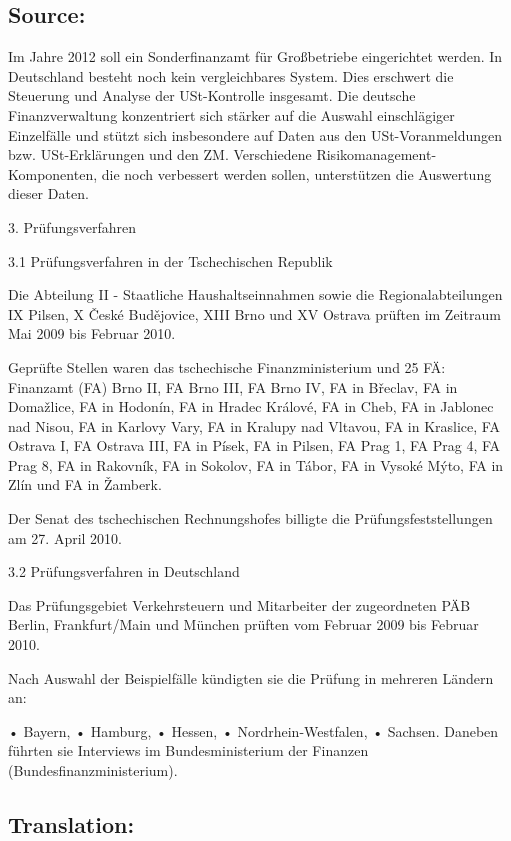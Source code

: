 \documentclass[10pt]{article}
\begin{document}
\subsection*{Source:}

Im Jahre 2012 soll ein Sonderfinanzamt für Großbetriebe eingerichtet werden.
In Deutschland besteht noch kein vergleichbares System. Dies erschwert die Steuerung und Analyse der USt-Kontrolle insgesamt.
Die deutsche Finanzverwaltung konzentriert sich stärker auf die Auswahl einschlägiger Einzelfälle und stützt sich insbesondere auf Daten aus den USt-Voranmeldungen bzw. USt-Erklärungen und den ZM.
Verschiedene Risikomanagement-Komponenten, die noch verbessert werden sollen, unterstützen die Auswertung dieser Daten.


3. Prüfungsverfahren 



3.1 Prüfungsverfahren in der Tschechischen Republik 

Die Abteilung II - Staatliche Haushaltseinnahmen sowie die Regionalabteilungen IX Pilsen, X České Budějovice, XIII Brno und XV Ostrava prüften im Zeitraum Mai 2009 bis Februar 2010.


Geprüfte Stellen waren das tschechische Finanzministerium und 25 FÄ: Finanzamt (FA) Brno II, FA Brno III, FA Brno IV, FA in Břeclav, FA in Domažlice, FA in Hodonín, FA in Hradec Králové, FA in Cheb, FA in Jablonec nad Nisou, FA in Karlovy Vary, FA in Kralupy nad Vltavou, FA in Kraslice, FA Ostrava I, FA Ostrava III, FA in Písek, FA in Pilsen, FA Prag 1, FA Prag 4, FA Prag 8, FA in Rakovník, FA in Sokolov, FA in Tábor, FA in Vysoké Mýto, FA in Zlín und FA in Žamberk. 



Der Senat des tschechischen Rechnungshofes billigte die Prüfungsfeststellungen am 27. April 2010. 



3.2 Prüfungsverfahren in Deutschland 

Das Prüfungsgebiet Verkehrsteuern und Mitarbeiter der zugeordneten PÄB Berlin, Frankfurt/Main und München prüften vom Februar 2009 bis Februar 2010.


Nach Auswahl der Beispielfälle kündigten sie die Prüfung in mehreren Ländern an:

• Bayern, • Hamburg, • Hessen, • Nordrhein-Westfalen, • Sachsen. Daneben führten sie Interviews im Bundesministerium der Finanzen (Bundesfinanzministerium).


\pagebreak

\subsection*{Translation:}
\end{document}
